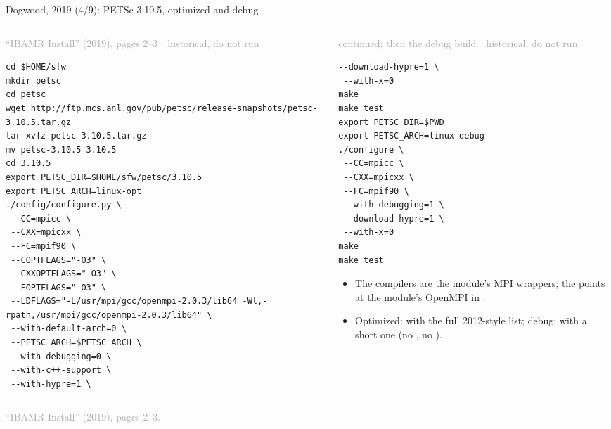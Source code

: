 \documentclass[aspectratio=169,11pt]{beamer}
\newcommand{\sourcecredit}[1]{\vfill\begin{flushright}\tiny\textcolor{DarkGray}{#1}\end{flushright}}
\newcommand{\hist}[1]{{\tiny\sffamily\textcolor{DarkGray}{#1\ \textbullet\ historical, do not run}}\par\nointerlineskip\vspace{0.3mm}}
\begin{document}
\begin{frame}[fragile]{Dogwood, 2019 (4/9): PETSc 3.10.5, optimized and debug}
\label{fr:dw4}
\begin{columns}[T,onlytextwidth]
\begin{column}{0.53\textwidth}
\hist{``IBAMR Install'' (2019), pages 2--3}
\begin{lstlisting}[style=hist]
cd $HOME/sfw
mkdir petsc
cd petsc
wget http://ftp.mcs.anl.gov/pub/petsc/release-snapshots/petsc-3.10.5.tar.gz
tar xvfz petsc-3.10.5.tar.gz
mv petsc-3.10.5 3.10.5
cd 3.10.5
export PETSC_DIR=$HOME/sfw/petsc/3.10.5
export PETSC_ARCH=linux-opt
./config/configure.py \
 --CC=mpicc \
 --CXX=mpicxx \
 --FC=mpif90 \
 --COPTFLAGS="-O3" \
 --CXXOPTFLAGS="-O3" \
 --FOPTFLAGS="-O3" \
 --LDFLAGS="-L/usr/mpi/gcc/openmpi-2.0.3/lib64 -Wl,-rpath,/usr/mpi/gcc/openmpi-2.0.3/lib64" \
 --with-default-arch=0 \
 --PETSC_ARCH=$PETSC_ARCH \
 --with-debugging=0 \
 --with-c++-support \
 --with-hypre=1 \
\end{lstlisting}
\end{column}
\begin{column}{0.44\textwidth}
\hist{continued; then the debug build}
\begin{lstlisting}[style=hist]
 --download-hypre=1 \
 --with-x=0
make
make test
export PETSC_DIR=$PWD
export PETSC_ARCH=linux-debug
./configure \
 --CC=mpicc \
 --CXX=mpicxx \
 --FC=mpif90 \
 --with-debugging=1 \
 --download-hypre=1 \
 --with-x=0
make
make test
\end{lstlisting}
\scriptsize
\begin{itemize}\setlength{\itemsep}{2pt}
  \item The compilers are the module's MPI wrappers; the  points at the module's OpenMPI in .
  \item Optimized:  with the full 2012-style list; debug:  with a short one (no , no ).
\end{itemize}
\end{column}
\end{columns}
\sourcecredit{``IBAMR Install'' (2019), pages 2--3.}
\end{frame}
\end{document}
